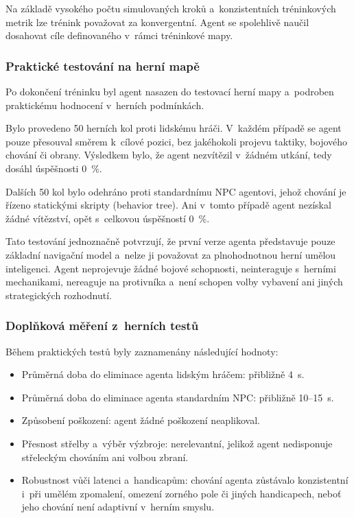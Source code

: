 Na základě vysokého počtu simulovaných kroků a~konzistentních tréninkových metrik lze trénink považovat za konvergentní. Agent se spolehlivě naučil dosahovat cíle definovaného v~rámci tréninkové mapy.

\subsubsection{Praktické testování na herní mapě}

Po dokončení tréninku byl agent nasazen do testovací herní mapy a~podroben praktickému hodnocení v~herních podmínkách.

Bylo provedeno 50 herních kol proti lidskému hráči. V~každém případě se agent pouze přesouval směrem k~cílové pozici, bez jakéhokoli projevu taktiky, bojového chování či obrany. Výsledkem bylo, že agent nezvítězil v~žádném utkání, tedy dosáhl úspěšnosti 0~\%.

Dalších 50 kol bylo odehráno proti standardnímu NPC agentovi, jehož chování je řízeno statickými skripty (behavior tree). Ani v~tomto případě agent nezískal žádné vítězství, opět s~celkovou úspěšností 0~\%.

Tato testování jednoznačně potvrzují, že první verze agenta představuje pouze základní navigační model a~nelze ji považovat za plnohodnotnou herní umělou inteligenci. Agent neprojevuje žádné bojové schopnosti, neinteraguje s~herními mechanikami, nereaguje na protivníka a~není schopen volby vybavení ani jiných strategických rozhodnutí.

\subsubsection{Doplňková měření z~herních testů}

Během praktických testů byly zaznamenány následující hodnoty:

\begin{itemize}
    \item Průměrná doba do eliminace agenta lidským hráčem: přibližně 4~s.
    \item Průměrná doba do eliminace agenta standardním NPC: přibližně 10--15~s.
    \item Způsobení poškození: agent žádné poškození neaplikoval.
    \item Přesnost střelby a~výběr výzbroje: nerelevantní, jelikož agent nedisponuje střeleckým chováním ani volbou zbraní.
    \item Robustnost vůči latenci a~handicapům: chování agenta zůstávalo konzistentní i~při umělém zpomalení, omezení zorného pole či jiných handicapech, neboť jeho chování není adaptivní v~herním smyslu.
\end{itemize}


